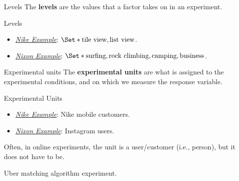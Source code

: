 \begin{Definition}{Levels}{}
    The \textbf{levels} are the values that a factor takes on in an experiment.
\end{Definition}
\begin{Example}{Levels}{}
    \begin{itemize}
        \item \emph{\hyperref[ex:nike_ex]{Nike Example}}: $ \Set*{\text{tile view}, \text{list view}} $.
        \item \emph{\hyperref[ex:nixon_ex]{Nixon Example}}: $ \Set*{\text{surfing}, \text{rock climbing}, \text{camping}, \text{business}} $.
    \end{itemize}
\end{Example}
\begin{Definition}{Experimental units}{}
    The \textbf{experimental units} are what is assigned to the experimental conditions,
    and on which we measure the response variable.
\end{Definition}
\begin{Example}{Experimental Units}{}
    \begin{itemize}
        \item \emph{\hyperref[ex:nike_ex]{Nike Example}}: Nike mobile customers.
        \item \emph{\hyperref[ex:nixon_ex]{Nixon Example}}: Instagram users.
    \end{itemize}
\end{Example}
\begin{Remark}{}{}
    Often, in online experiments, the unit is a user/customer (i.e., person), but it does
    not have to be.
    \begin{Example}{}{}
        Uber matching algorithm experiment.
    \end{Example}
\end{Remark}
